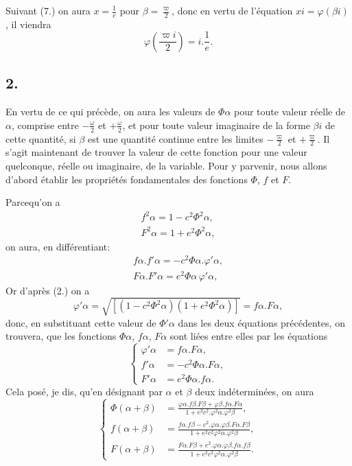 \documentclass{article}
\begin{document}

Suivant (7.) on aura $x=\frac{1}{e}$ pour $\beta=\frac{\varpi}{2}$, donc en vertu de l'équation $xi=\varphi(\beta i)$, il viendra
\[ \varphi\left(\frac{\varpi i}{2}\right)=i.\frac{1}{e}. \tag{8.} \]

\subsection*{2.}

En vertu de ce qui précède, on aura les valeurs de $\Phi\alpha$ pour toute valeur réelle de $\alpha$, comprise entre $-\frac{\omega}{2}$ et $+\frac{\omega}{2}$, et pour toute valeur imaginaire de la forme $\beta i$ de cette quantité, si $\beta$ est une quantité continue entre les limites $-\frac{\varpi}{2}$ et $+\frac{\varpi}{2}$. Il s'agit maintenant de trouver la valeur de cette fonction pour une valeur quelconque, réelle ou imaginaire, de la variable. Pour y parvenir, nous allons d'abord établir les propriétés fondamentales des fonctions $\Phi$, $f$ et $F$.

Parcequ'on a
\[ \begin{gathered} f^{2}\alpha=1-c^{2}\Phi^{2}\alpha,\\ F^{2}\alpha=1+e^{2}\Phi^{2}\alpha, \end{gathered} \]
on aura, en différentiant:
\[ \begin{gathered} f\alpha.f'\alpha=-c^{2}\Phi\alpha.\varphi'\alpha,\\ F\alpha.F'\alpha=e^{2}\Phi\alpha\,\varphi'\alpha, \end{gathered} \]
Or d'après (2.) on a
\[ \varphi'\alpha=\sqrt{[(1-c^{2}\Phi^{2}\alpha)(1+e^{2}\Phi^{2}\alpha)]}=f\alpha.F\alpha, \]
donc, en substituant cette valeur de $\Phi'\alpha$ dans les deux équations précédentes, on trouvera, que les fonctions $\Phi\alpha$, $f\alpha$, $F\alpha$ sont liées entre elles par les équations
\[ \left\{\begin{aligned} \varphi'\alpha&=f\alpha.F\alpha,\\ f'\alpha&=-c^{2}\Phi\alpha.F\alpha,\\ F'\alpha&=e^{2}\Phi\alpha.f\alpha. \end{aligned}\right. \tag{9.} \]
Cela posé, je dis, qu'en désignant par $\alpha$ et $\beta$ deux indéterminées, on aura
\[ \left\{\begin{aligned} \Phi(\alpha+\beta)&=\frac{\varphi\alpha.f\beta.F\beta+\varphi\beta.f\alpha.F\alpha}{1+e^{2}c^{2}.\varphi^{2}\alpha.\varphi^{2}\beta},\\ f(\alpha+\beta)&=\frac{f\alpha.f\beta-c^{2}.\varphi\alpha.\varphi\beta.F\alpha.F\beta}{1+e^{2}c^{2}\varphi^{2}\alpha.\varphi^{2}\beta},\\ F(\alpha+\beta)&=\frac{F\alpha.F\beta+e^{2}.\varphi\alpha.\varphi\beta.f\alpha.f\beta}{1+e^{2}c^{2}\varphi^{2}\alpha.\varphi^{2}\beta}. \end{aligned}\right. \tag{10.} \]
\end{document}
